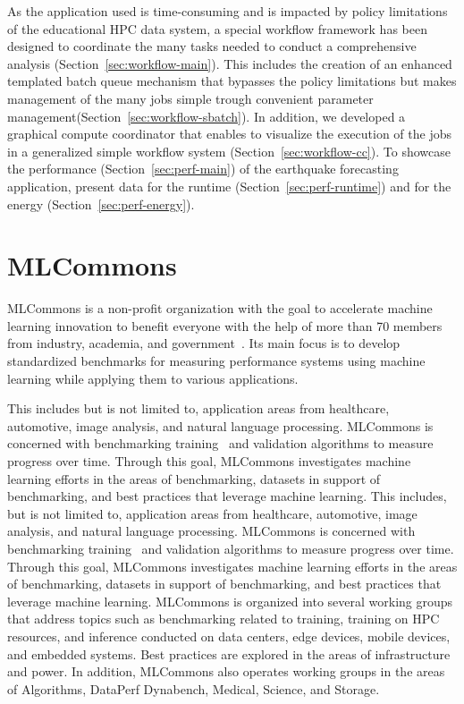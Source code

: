 \documentclass[utf8]{FrontiersinVancouver} %
\begin{document}
As the application used is time-consuming and is impacted by policy
limitations of the educational HPC data system, a special workflow
framework has been designed to coordinate the many tasks needed to
conduct a comprehensive analysis
(Section~\ref{sec:workflow-main}). This includes the creation of an
enhanced templated batch queue mechanism that bypasses the policy
limitations but makes management of the many jobs simple trough
convenient parameter management(Section~\ref{sec:workflow-sbatch}). In
addition, we developed a graphical compute coordinator that enables to
visualize the execution of the jobs in a generalized simple workflow
system (Section~\ref{sec:workflow-cc}).  To showcase the performance
(Section~\ref{sec:perf-main}) of the earthquake forecasting
application, present data for the runtime
(Section~\ref{sec:perf-runtime}) and for the energy
(Section~\ref{sec:perf-energy}).


\section{MLCommons}
\label{sec:mlcommons}

MLCommons is a non-profit organization with the goal to accelerate
machine learning innovation to benefit everyone with the help of more
than 70 members from industry, academia, and
government~\citep{www-mlcommons}.  Its main focus is to develop
standardized benchmarks for measuring performance systems using
machine learning while applying them to various applications.

This includes but is not limited to, application areas from
healthcare, automotive, image analysis, and natural language
processing. MLCommons is concerned with benchmarking
training~\citep{mlperf-training} and validation algorithms to measure
progress over time. Through this goal, MLCommons investigates machine
learning efforts in the areas of benchmarking, datasets in support of
benchmarking, and best practices that leverage machine learning. This
includes, but is not limited to, application areas from healthcare,
automotive, image analysis, and natural language processing. MLCommons
is concerned with benchmarking training~\citep{mlperf-training} and
validation algorithms to measure progress over time. Through this
goal, MLCommons investigates machine learning efforts in the areas of
benchmarking, datasets in support of benchmarking, and best practices
that leverage machine learning. MLCommons is organized into several
working groups that address topics such as benchmarking related to
training, training on HPC resources, and inference conducted on data
centers, edge devices, mobile devices, and embedded systems. Best
practices are explored in the areas of infrastructure and power. In
addition, MLCommons also operates working groups in the areas of
Algorithms, DataPerf Dynabench, Medical, Science, and Storage.
\end{document}

